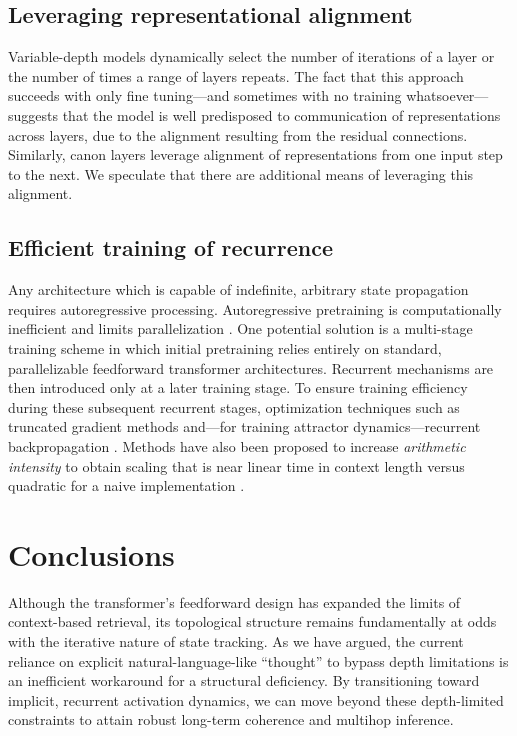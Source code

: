 \documentclass{llmxive}
\begin{document}
\subsection{Leveraging representational alignment}
Variable-depth models dynamically select the number of iterations of a layer or
the number of times a range of layers repeats. The fact that this approach succeeds
with only fine tuning---and sometimes with no training whatsoever---suggests that 
the model is well predisposed to communication of representations across layers,
due to the alignment resulting from the residual connections. Similarly,
canon layers \citep{allenzhu2025physicslanguagemodels1} leverage alignment of
representations from one input step to the next. We speculate that there are
additional means of leveraging this alignment.

\subsection{Efficient training of recurrence}
Any architecture which is capable of indefinite, arbitrary state propagation 
requires autoregressive processing. Autoregressive pretraining is 
computationally inefficient and limits parallelization \citep{chevalier2023adaptinglanguagemodelscompress}.  One potential solution is
a multi-stage training scheme in which initial pretraining relies entirely on
standard, parallelizable feedforward transformer architectures.
Recurrent mechanisms are then introduced only at a later training stage. 
To ensure training efficiency during these subsequent recurrent stages, 
optimization techniques such as truncated gradient methods 
and---for training attractor dynamics---recurrent backpropagation 
\citep{almeida1987learning,pineda1987generalization,liao2018}.
Methods have also been proposed to increase \emph{arithmetic intensity} to obtain scaling
that is near linear time in context length versus quadratic for a naive implementation
\citep{oncescu2026}.

\section{Conclusions}
Although the transformer’s feedforward design has expanded the limits of context-based
retrieval, its topological structure remains fundamentally at odds with the 
iterative nature of state tracking. As we have argued, the current reliance on 
explicit natural-language-like ``thought'' to bypass depth limitations is an inefficient workaround for a structural deficiency. By transitioning toward implicit, recurrent activation dynamics, we can move beyond these depth-limited constraints to attain 
robust long-term coherence and multihop inference.
\end{document}
